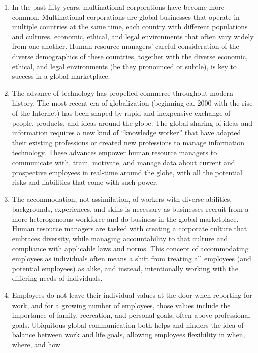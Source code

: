 \documentclass[12pt,apa,article,oneside,strict,titlepage]{eyered}
\begin{document}
\begin{enumerate}
\def\labelenumi{\arabic{enumi}.}
\item
  In the past fifty years, multinational corporations have become more
  common. Multinational corporations are global businesses that operate
  in multiple countries at the same time, each country with different
  populations and cultures. economic, ethical, and legal environments
  that often vary widely from one another. Human resource managers'
  careful consideration of the diverse demographics of these countries,
  together with the diverse economic, ethical, and legal environments
  (be they pronounced or subtle), is key to success in a global
  marketplace.
\item
  The advance of technology has propelled commerce throughout modern
  history. The most recent era of globalization (beginning ca. 2000 with
  the rise of the Internet) has been shaped by rapid and inexpensive
  exchange of people, products, and ideas around the globe. The global
  sharing of ideas and information requires a new kind of ``knowledge
  worker'' that have adapted their existing professions or created new
  professions to manage information technology. These advances empower
  human resource managers to communicate with, train, motivate, and
  manage data about current and prospective employees in real-time
  around the globe, with all the potential risks and liabilities that
  come with such power.
\item
  The accommodation, not assimilation, of workers with diverse
  abilities, backgrounds, experiences, and skills is necessary as
  businesses recruit from a more heterogeneous workforce and do business
  in the global marketplace. Human resource managers are tasked with
  creating a corporate culture that embraces diversity, while managing
  accountability to that culture and compliance with applicable laws and
  norms. This concept of accommodating employees as individuals often
  means a shift from treating all employees (and potential employees) as
  alike, and instead, intentionally working with the differing needs of
  individuals.
\item
  Employees do not leave their individual values at the door when
  reporting for work, and for a growing number of employees, those
  values include the importance of family, recreation, and personal
  goals, often above professional goals. Ubiquitous global communication
  both helps and hinders the idea of balance between work and life
  goals, allowing employees flexibility in when, where, and how

\end{enumerate}
\end{document}
